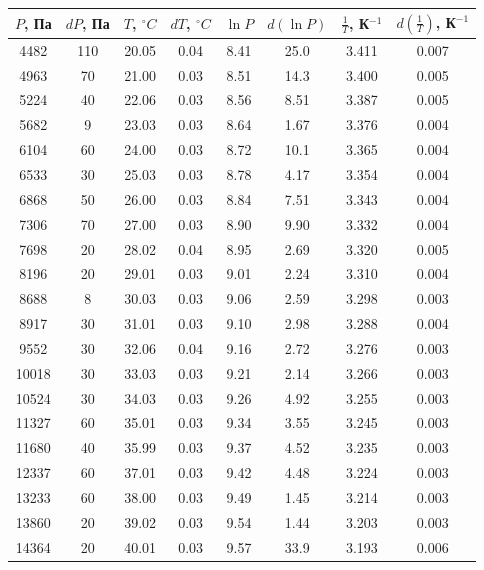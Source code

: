 \documentclass[a4paper,12pt]{article} %
\begin{document}
\begin{enumerate}
  \begin{table}[h]
    \centering
    \begin{tabular}{|c|c|c|c||c|c|c|c|}
      \hline
      $P$, Па & $dP$, Па & $T$, $^\circ C$ & $dT$, $^\circ C$ & $\ln P$ & $d(\ln P)$ & $\frac{1}{T}$, К$^{-1}$ & $d\left(\frac{1}{T}\right)$, К$^{-1}$ \\
      \hline
      4482 & 110 & 20.05 & 0.04 & 8.41 & 25.0 & 3.411 & 0.007 \\
      4963 & 70 & 21.00 & 0.03 & 8.51 & 14.3 & 3.400 & 0.005 \\
      5224 & 40 & 22.06 & 0.03 & 8.56 & 8.51 & 3.387 & 0.005 \\
      5682 & 9 & 23.03 & 0.03 & 8.64 & 1.67 & 3.376 & 0.004 \\
      6104 & 60 & 24.00 & 0.03 & 8.72 & 10.1 & 3.365 & 0.004 \\
      6533 & 30 & 25.03 & 0.03 & 8.78 & 4.17 & 3.354 & 0.004 \\
      6868 & 50 & 26.00 & 0.03 & 8.84 & 7.51 & 3.343 & 0.004 \\
      7306 & 70 & 27.00 & 0.03 & 8.90 & 9.90 & 3.332 & 0.004 \\
      7698 & 20 & 28.02 & 0.04 & 8.95 & 2.69 & 3.320 & 0.005 \\
      8196 & 20 & 29.01 & 0.03 & 9.01 & 2.24 & 3.310 & 0.004 \\
      8688 & 8 & 30.03 & 0.03 & 9.06 & 2.59 & 3.298 & 0.003 \\
      8917 & 30 & 31.01 & 0.03 & 9.10 & 2.98 & 3.288 & 0.004 \\
      9552 & 30 & 32.06 & 0.04 & 9.16 & 2.72 & 3.276 & 0.003 \\
      10018 & 30 & 33.03 & 0.03 & 9.21 & 2.14 & 3.266 & 0.003 \\
      10524 & 30 & 34.03 & 0.03 & 9.26 & 4.92 & 3.255 & 0.003 \\
      11327 & 60 & 35.01 & 0.03 & 9.34 & 3.55 & 3.245 & 0.003 \\
      11680 & 40 & 35.99 & 0.03 & 9.37 & 4.52 & 3.235 & 0.003 \\
      12337 & 60 & 37.01 & 0.03 & 9.42 & 4.48 & 3.224 & 0.003 \\
      13233 & 60 & 38.00 & 0.03 & 9.49 & 1.45 & 3.214 & 0.003 \\
      13860 & 20 & 39.02 & 0.03 & 9.54 & 1.44 & 3.203 & 0.003 \\
      14364 & 20 & 40.01 & 0.03 & 9.57 & 33.9 & 3.193 & 0.006 \\
      \hline
      \end{tabular}
      

\end{table}
\end{enumerate}
\end{document}
